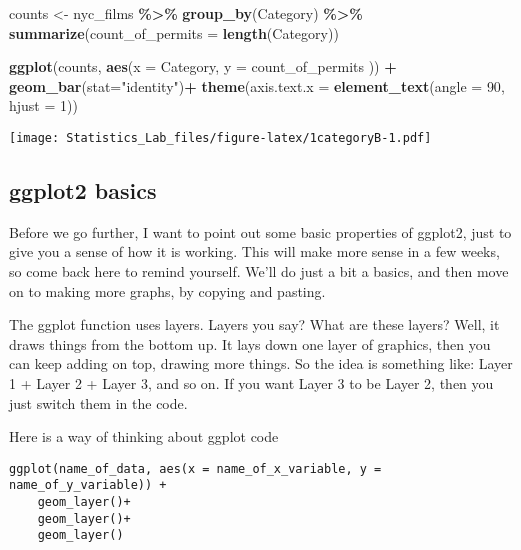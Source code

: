\documentclass[
]{book}
\newenvironment{Shaded}{\begin{snugshade}}{\end{snugshade}}
\newcommand{\AttributeTok}[1]{\textcolor[rgb]{0.13,0.29,0.53}{#1}}
\newcommand{\DecValTok}[1]{\textcolor[rgb]{0.00,0.00,0.81}{#1}}
\newcommand{\FunctionTok}[1]{\textcolor[rgb]{0.13,0.29,0.53}{\textbf{#1}}}
\newcommand{\NormalTok}[1]{#1}
\newcommand{\OtherTok}[1]{\textcolor[rgb]{0.56,0.35,0.01}{#1}}
\newcommand{\SpecialCharTok}[1]{\textcolor[rgb]{0.81,0.36,0.00}{\textbf{#1}}}
\newcommand{\StringTok}[1]{\textcolor[rgb]{0.31,0.60,0.02}{#1}}
\begin{document}
\begin{Shaded}
\begin{Highlighting}[]
\NormalTok{counts }\OtherTok{\textless{}{-}}\NormalTok{ nyc\_films }\SpecialCharTok{\%\textgreater{}\%}
          \FunctionTok{group\_by}\NormalTok{(Category) }\SpecialCharTok{\%\textgreater{}\%}
          \FunctionTok{summarize}\NormalTok{(}\AttributeTok{count\_of\_permits =} \FunctionTok{length}\NormalTok{(Category))}

\FunctionTok{ggplot}\NormalTok{(counts, }\FunctionTok{aes}\NormalTok{(}\AttributeTok{x =}\NormalTok{ Category, }\AttributeTok{y =}\NormalTok{ count\_of\_permits )) }\SpecialCharTok{+}
  \FunctionTok{geom\_bar}\NormalTok{(}\AttributeTok{stat=}\StringTok{"identity"}\NormalTok{)}\SpecialCharTok{+} 
  \FunctionTok{theme}\NormalTok{(}\AttributeTok{axis.text.x =} \FunctionTok{element\_text}\NormalTok{(}\AttributeTok{angle =} \DecValTok{90}\NormalTok{, }\AttributeTok{hjust =} \DecValTok{1}\NormalTok{))}
\end{Highlighting}
\end{Shaded}

\texttt{[image: Statistics\_Lab\_files/figure-latex/1categoryB-1.pdf]}

\hypertarget{ggplot2-basics}{%
\subsection{ggplot2 basics}\label{ggplot2-basics}}

Before we go further, I want to point out some basic properties of ggplot2, just to give you a sense of how it is working. This will make more sense in a few weeks, so come back here to remind yourself. We'll do just a bit a basics, and then move on to making more graphs, by copying and pasting.

The ggplot function uses layers. Layers you say? What are these layers? Well, it draws things from the bottom up. It lays down one layer of graphics, then you can keep adding on top, drawing more things. So the idea is something like: Layer 1 + Layer 2 + Layer 3, and so on. If you want Layer 3 to be Layer 2, then you just switch them in the code.

Here is a way of thinking about ggplot code

\begin{verbatim}
ggplot(name_of_data, aes(x = name_of_x_variable, y = name_of_y_variable)) +
    geom_layer()+
    geom_layer()+
    geom_layer()
\end{verbatim}
\end{document}

